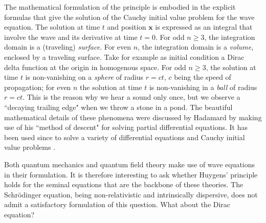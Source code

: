 The mathematical formulation of the principle is embodied in the explicit formulas that give the solution of the Cauchy initial value problem for the wave equation. The solution at time $t$ and position $\bm x$ is expressed as an integral that involve the wave and its derivative at time $t=0$. For odd $n \geq 3$, the integration domain is a (traveling) \emph{surface}. For even $n$, the integration domain is a \emph{volume}, enclosed by a traveling surface. Take for example as initial condition a Dirac delta function at the origin in homogenous space.
For odd $n \geq 3$, the solution at time $t$ is non-vanishing on a \emph{sphere} of radius $r=ct$, $c$ being the speed of propagation; for even $n$ the solution at time $t$ is non-vanishing in a \emph{ball} of radius $r=ct$. This is the reason why we hear a sound only once, but we observe a ``decaying trailing edge" when we throw a stone in a pond. The beautiful mathematical details of these phenomena were discussed by Hadamard by making use of his ``method of descent" for solving partial differential equations. 
It has been used since to solve a variety of differential equations and Cauchy initial value problems \cite{zac,evans}. 

Both quantum mechanics and quantum field theory make use of wave equations in their formulation. It is therefore interesting to ask whether Huygens' principle holds for the seminal equations that are the backbone of these theories. The Schr\"odinger equation, being non-relativistic {and intrinsically dispersive}, does not admit a satisfactory formulation of this question. What about the Dirac equation? 

